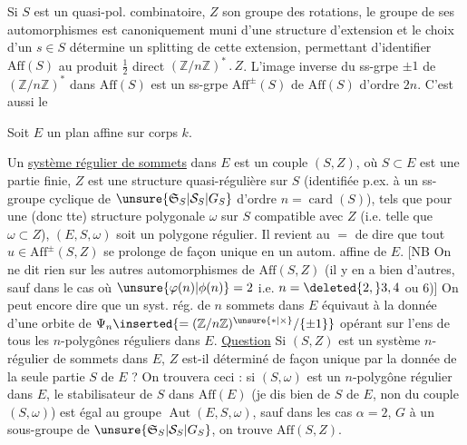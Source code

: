 Si $S$ est un quasi-pol. combinatoire, $Z$ son groupe des rotations, le groupe de ses automorphismes  est canoniquement muni d'une structure d'extension
et le choix d'un $s\in S$ détermine un splitting de cette extension, permettant d'identifier $\mathrm{Aff}(S)$ au produit $\frac12$ direct $(\mathbb Z/n\mathbb Z)^*\mathbin{.}Z$. L'image inverse du ss-grpe $\pm1$ de $(\mathbb Z/n\mathbb Z)^*$ dans $\mathrm{Aff}(S)$ est un ss-grpe $\mathrm{Aff}^{\pm}(S)$ de $\mathrm{Aff}(S)$ d'ordre $2n$. C'est aussi le

Soit $E$ un plan affine sur corps $k$.

Un \uline{système régulier de sommets} dans $E$ est  un couple $(S,Z)$, où $S\subset E$ est une partie finie,
$Z$ est une structure quasi-régulière sur $S$ (identifiée p.ex. à un ss-groupe cyclique de $\unsure{\mathfrak S_S|\mathcal S_S|G_S}$ d'ordre $n=\operatorname{card}(S)$), tels que pour une (donc tte) structure polygonale $\omega$ sur $S$ compatible avec $Z$ (i.e. telle que $\omega\subset Z$), $(E,S,\omega)$ soit un polygone régulier. Il revient au $=$ de dire que tout $u\in\mathrm{Aff}^{\pm}(S,Z)$ se prolonge de façon unique en un autom. affine de $E$. [NB On ne dit rien sur les autres automorphismes de $\mathrm{Aff}(S,Z)$ 
(il y en a bien d'autres, sauf dans le cas où $\unsure{\varphi(n)|\phi(n)}=2$  i.e. $n=\deleted{2,}3,4$ ou $6$)] On peut encore dire que un  syst. rég. de $n$ sommets dans $E$ équivaut à la donnée d'une orbite de $\Psi_n\inserted{=(\mathbb Z/n\mathbb Z)^{\unsure{*|\times}}/\{\pm1\}}$ opérant sur l'ens de tous les $n$-polygônes réguliers dans $E$.
\uline{Question} Si $(S,Z)$ est un système $n$-régulier de sommets dans $E$, $Z$ est-il déterminé de façon unique par la donnée de la seule partie $S$ de $E$ ? On trouvera ceci : si $(S,\omega)$ est un $n$-polygône régulier dans $E$, le stabilisateur  de $S$ dans $\mathrm{Aff}(E)$ (je dis bien de  $S$ de $E$, non du couple $(S,\omega)$) est égal au groupe $\operatorname{Aut}(E,S,\omega)$, sauf dans les cas $\alpha=2$,   $G$ à un sous-groupe de $\unsure{\mathfrak S_S|\mathcal S_S|G_S}$, on trouve $\mathrm{Aff}(S,Z)$.

